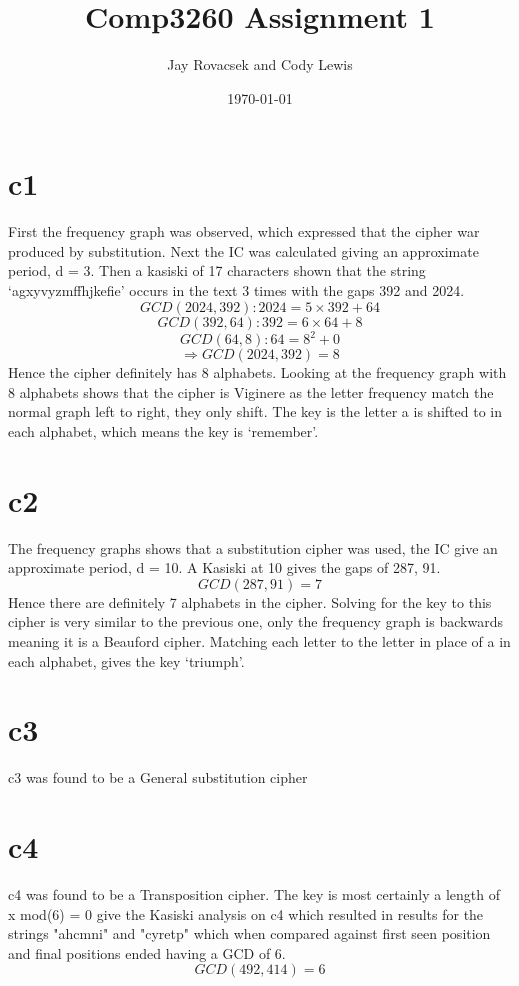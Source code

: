 \documentclass{article}
\title{Comp3260 Assignment 1}
\author{Jay Rovacsek and Cody Lewis}
\date{\today}
\begin{document}
  \maketitle

  \section{c1}
    First the frequency graph was observed, which expressed that the cipher
    war produced by substitution. Next the IC was calculated giving an 
    approximate period, d = 3. Then a kasiski of 17 characters shown that the
    string `agxyvyzmffhjkefie' occurs in the text 3 times with the gaps
    392 and 2024.
      \[ GCD(2024,392): 2024 = 5 \times 392 + 64 \] 
      \[ GCD(392,64): 392 = 6 \times 64 + 8 \] 
      \[ GCD(64,8): 64 = 8^2 + 0 \] 
      \[ \Rightarrow GCD(2024,392) = 8 \] 
    Hence the cipher definitely has 8 alphabets. Looking at the frequency 
    graph with 8 alphabets shows that the cipher is Viginere as the letter 
    frequency match the normal graph left to right, they only shift. The 
    key is the letter a is shifted to in each alphabet, which means the key 
    is `remember'.
  \section{c2}
    The frequency graphs shows that a substitution cipher was used, the IC
    give an approximate period, d = 10. A Kasiski at 10 gives the gaps of 287,
    91.
      \[ GCD(287,91) = 7 \]
    Hence there are definitely 7 alphabets in the cipher. Solving for the key
    to this cipher is very similar to the previous one, only the frequency 
    graph is backwards meaning it is a Beauford cipher. Matching each letter
    to the letter in place of a in each alphabet, gives the key `triumph'.
  \section{c3}
    c3 was found to be a General substitution cipher
  \section{c4}
    c4 was found to be a Transposition cipher. The key is most certainly a length of 
    x mod(6) = 0 give the Kasiski analysis on c4 which resulted in results for the
    strings "ahcmni" and "cyretp" which when compared against first seen position and
    final positions ended having a GCD of 6.
      \[ GCD(492,414) = 6 \]
\end{document}

